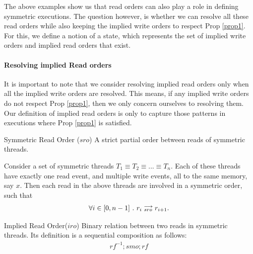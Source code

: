     The above examples show us that read orders can also play a role in defining symmetric executions.
    The question however, is whether we can resolve all these read orders while also keeping the implied write orders to respect Prop \ref{prop1}.
    For this, we define a notion of a state, which represents the set of implied write orders and implied read orders that exist.    

    \paragraph{Resolving implied Read orders}

        It is important to note that we consider resolving implied read orders only when all the implied write orders are resolved.
        This means, if any implied write orders do not respect Prop \ref{prop1}, then we only concern ourselves to resolving them.
        Our definition of implied read orders is only to capture those patterns in executions where Prop \ref{prop1} is satisfied.
        
        \begin{definition}{Symmetric Read Order ($sro$)}
            \label{SymReadOrd}
            A strict partial order between reads of symmetric threads.
            
            Consider a set of symmetric threads $T_1 \equiv T_2 \equiv ... \equiv T_n$. 
            Each of these threads have exactly one read event, and multiple write events, all to the same memory, say $x$. 
            Then each read in the above threads are involved in a symmetric order, such that
            \begin{align*}
                \forall i \in [0, n-1] \ . \ r_i\stackrel{\longrightarrow}{_{sro}}r_{i+1}.
            \end{align*}

        \end{definition}

        \begin{definition}{Implied Read Order($iro$)}
            \label{ImpReadOrd}
            Binary relation between two reads in symmetric threads. 
            Its definition is a sequential composition as follows:
            \begin{align*}
                rf^{-1};smo;rf
            \end{align*} 

        \end{definition}

